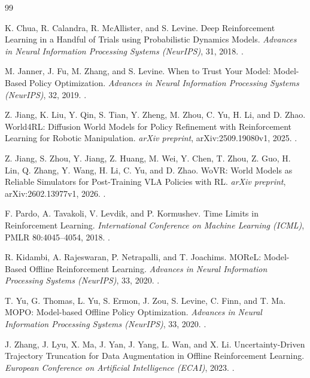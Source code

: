 \begin{thebibliography}{99}

K. Chua, R. Calandra, R. McAllister, and S. Levine.
\newblock Deep Reinforcement Learning in a Handful of Trials using Probabilistic Dynamics Models.
\newblock \emph{Advances in Neural Information Processing Systems (NeurIPS)}, 31, 2018.
\newblock {}.

M. Janner, J. Fu, M. Zhang, and S. Levine.
\newblock When to Trust Your Model: Model-Based Policy Optimization.
\newblock \emph{Advances in Neural Information Processing Systems (NeurIPS)}, 32, 2019.
\newblock {}.

Z. Jiang, K. Liu, Y. Qin, S. Tian, Y. Zheng, M. Zhou, C. Yu, H. Li, and D. Zhao.
\newblock World4RL: Diffusion World Models for Policy Refinement with Reinforcement Learning for Robotic Manipulation.
\newblock \emph{arXiv preprint}, arXiv:2509.19080v1, 2025.
\newblock {}.

Z. Jiang, S. Zhou, Y. Jiang, Z. Huang, M. Wei, Y. Chen, T. Zhou, Z. Guo, H. Lin, Q. Zhang, Y. Wang, H. Li, C. Yu, and D. Zhao.
\newblock WoVR: World Models as Reliable Simulators for Post-Training VLA Policies with RL.
\newblock \emph{arXiv preprint}, arXiv:2602.13977v1, 2026.
\newblock {}.

F. Pardo, A. Tavakoli, V. Levdik, and P. Kormushev.
\newblock Time Limits in Reinforcement Learning.
\newblock \emph{International Conference on Machine Learning (ICML)}, PMLR 80:4045--4054, 2018.
\newblock {}.

R. Kidambi, A. Rajeswaran, P. Netrapalli, and T. Joachims.
\newblock MOReL: Model-Based Offline Reinforcement Learning.
\newblock \emph{Advances in Neural Information Processing Systems (NeurIPS)}, 33, 2020.
\newblock {}.

T. Yu, G. Thomas, L. Yu, S. Ermon, J. Zou, S. Levine, C. Finn, and T. Ma.
\newblock MOPO: Model-based Offline Policy Optimization.
\newblock \emph{Advances in Neural Information Processing Systems (NeurIPS)}, 33, 2020.
\newblock {}.

J. Zhang, J. Lyu, X. Ma, J. Yan, J. Yang, L. Wan, and X. Li.
\newblock Uncertainty-Driven Trajectory Truncation for Data Augmentation in Offline Reinforcement Learning.
\newblock \emph{European Conference on Artificial Intelligence (ECAI)}, 2023.
\newblock {}.


\end{thebibliography}
